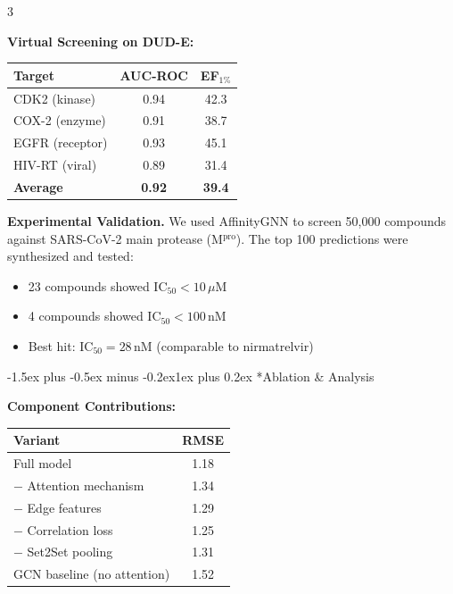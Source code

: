 \documentclass[a0paper,portrait]{article}
\makeatletter
\renewcommand{\section}{\@startsection{section}{1}{0pt}%
  {-1.5ex plus -0.5ex minus -0.2ex}{1ex plus 0.2ex}%
  {\LARGE\bfseries\color{sectioncolor}}}
\makeatother
\begin{document}
\begin{multicols}{3}
\vspace{1cm}

\textbf{Virtual Screening on DUD-E:}

\vspace{0.5cm}

\begin{center}
\renewcommand{\arraystretch}{1.4}
{\large
\begin{tabular}{@{}lcc@{}}
\toprule
\textbf{Target} & \textbf{AUC-ROC} & \textbf{EF$_{1\%}$} \\
\midrule
CDK2 (kinase)     & 0.94 & 42.3 \\
COX-2 (enzyme)    & 0.91 & 38.7 \\
EGFR (receptor)   & 0.93 & 45.1 \\
HIV-RT (viral)    & 0.89 & 31.4 \\
\midrule
\textbf{Average}  & \textbf{0.92} & \textbf{39.4} \\
\bottomrule
\end{tabular}}
\end{center}

\vspace{1cm}

\textbf{Experimental Validation.} We used AffinityGNN to screen 50,000 compounds against SARS-CoV-2 main protease (M$^{\text{pro}}$). The top 100 predictions were synthesized and tested:
\begin{itemize}[leftmargin=1.5em, itemsep=4pt]
  \item 23 compounds showed IC$_{50} < 10\,\mu$M
  \item 4 compounds showed IC$_{50} < 100\,$nM
  \item Best hit: IC$_{50} = 28\,$nM (comparable to nirmatrelvir)
\end{itemize}

\columnbreak

\section*{Ablation \& Analysis}

\textbf{Component Contributions:}

\vspace{0.5cm}

\begin{center}
\renewcommand{\arraystretch}{1.4}
{\large
\begin{tabular}{@{}lc@{}}
\toprule
\textbf{Variant} & \textbf{RMSE} \\
\midrule
Full model                   & 1.18 \\
$-$ Attention mechanism      & 1.34 \\
$-$ Edge features            & 1.29 \\
$-$ Correlation loss         & 1.25 \\
$-$ Set2Set pooling          & 1.31 \\
GCN baseline (no attention)  & 1.52 \\
\bottomrule
\end{tabular}}
\end{center}


\end{multicols}
\end{document}
